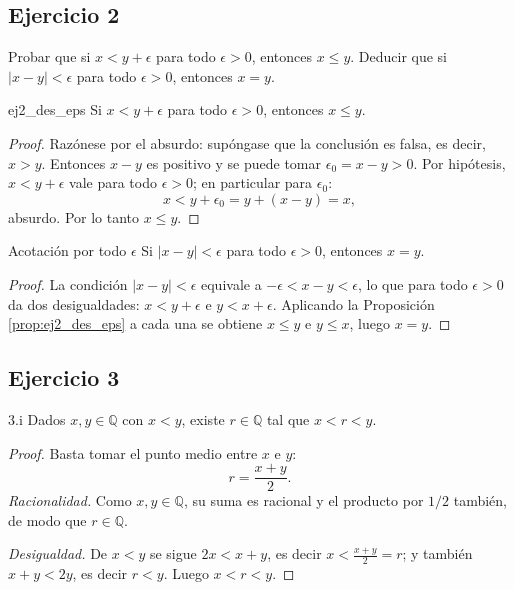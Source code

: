\documentclass[11pt, a4paper]{article}
\begin{document}
\subsection*{Ejercicio 2}

Probar que si $x < y + \epsilon$ para todo $\epsilon > 0$, entonces $x \le y$. Deducir que si
$|x - y| < \epsilon$ para todo $\epsilon > 0$, entonces $x = y$.

\begin{proposicion}{}{ej2_des_eps}
Si $x < y + \epsilon$ para todo $\epsilon > 0$, entonces $x \le y$.
\end{proposicion}

\begin{proof}
Razónese por el absurdo: supóngase que la conclusión es falsa, es decir, $x > y$. Entonces $x - y$
es positivo y se puede tomar $\epsilon_0 = x - y > 0$. Por hipótesis, $x < y + \epsilon$ vale para
todo $\epsilon > 0$; en particular para $\epsilon_0$:
$$ x < y + \epsilon_0 = y + (x - y) = x, $$
absurdo. Por lo tanto $x \le y$.
\end{proof}

\begin{corolario}{Acotación por todo $\epsilon$}{}
Si $|x - y| < \epsilon$ para todo $\epsilon > 0$, entonces $x = y$.
\end{corolario}

\begin{proof}
La condición $|x - y| < \epsilon$ equivale a $-\epsilon < x - y < \epsilon$, lo que para todo
$\epsilon > 0$ da dos desigualdades: $x < y + \epsilon$ e $y < x + \epsilon$. Aplicando la
Proposición \ref{prop:ej2_des_eps} a cada una se obtiene $x \le y$ e $y \le x$, luego $x = y$.
\end{proof}

\subsection*{Ejercicio 3}

\begin{proposicion}{3.i}{}
Dados $x, y \in \mathbb{Q}$ con $x < y$, existe $r \in \mathbb{Q}$ tal que $x < r < y$.
\end{proposicion}

\begin{proof}
Basta tomar el punto medio entre $x$ e $y$:
$$ r = \frac{x + y}{2}. $$
\textit{Racionalidad.} Como $x, y \in \mathbb{Q}$, su suma es racional y el producto por $1/2$
también, de modo que $r \in \mathbb{Q}$.

\textit{Desigualdad.} De $x < y$ se sigue $2x < x + y$, es decir $x < \frac{x+y}{2} = r$; y también
$x + y < 2y$, es decir $r < y$. Luego $x < r < y$.
\end{proof}
\end{document}

